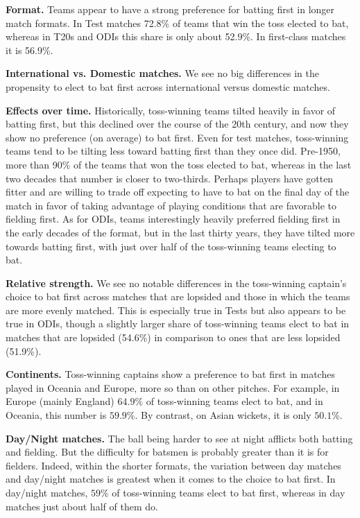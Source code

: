 \documentclass[11pt,  letterpaper]{article}
\begin{document}
\textbf{Format.} Teams appear to have a strong preference for batting first in longer match formats. In Test matches 72.8\% of teams that win the toss elected to bat, whereas in T20s and ODIs this share is only about 52.9\%. In first-class matches it is 56.9\%. 

\textbf{International vs. Domestic matches.} We see no big differences in the propensity to elect to bat first across international versus domestic matches.

\textbf{Effects over time.} Historically, toss-winning teams tilted heavily in favor of batting first, but this declined over the course of the 20th century, and now they show no preference (on average) to bat first. Even for test matches, toss-winning teams tend to be tilting less toward batting first than they once did. Pre-1950, more than 90\% of the teams that won the toss elected to bat, whereas in the last two decades that number is closer to two-thirds. Perhaps players have gotten fitter and are willing to trade off expecting to have to bat on the final day of the match in favor of taking advantage of playing conditions that are favorable to fielding first. As for ODIs, teams interestingly heavily preferred fielding first in the early decades of the format, but in the last thirty years, they have tilted more towards batting first, with just over half of the toss-winning teams electing to bat.

\textbf{Relative strength.} We see no notable differences in the toss-winning captain's choice to bat first across matches that are lopsided and those in which the teams are more evenly matched. This is especially true in Tests but also appears to be true in ODIs, though a slightly larger share of toss-winning teams elect to bat in matches that are lopsided (54.6\%) in comparison to ones that are less lopsided (51.9\%).

\textbf{Continents.} Toss-winning captains show a preference to bat first in matches played in Oceania and Europe, more so than on other pitches. For example, in Europe (mainly England) $64.9\%$ of toss-winning teams elect to bat, and in Oceania, this number is $59.9\%$. By contrast, on Asian wickets, it is only $50.1\%$.

\textbf{Day/Night matches.} The ball being harder to see at night afflicts both batting and fielding. But the difficulty for batsmen is probably greater than it is for fielders. Indeed, within the shorter formats, the variation between day matches and day/night matches is greatest when it comes to the choice to bat first. In day/night matches, $59\%$ of toss-winning teams elect to bat first, whereas in day matches just about half of them do.
\end{document}
